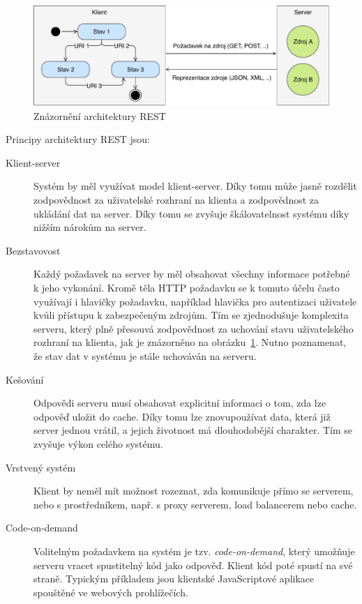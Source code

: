 \begin{figure}[t]
    \centering
    \includegraphics[keepaspectratio=true, width=0.9\linewidth]{figures/rest-statelessness.pdf}
    \caption{Znázornění architektury \gls{REST}}
    \label{fig:rest-statelessness}
\end{figure}

Principy architektury \gls{REST} jsou:

\begin{description}
    \item [Klient-server] Systém by měl využívat model klient-server. Díky tomu může jasně rozdělit
    zodpovědnost za uživatelské rozhraní na klienta a zodpovědnost za ukládání dat na server. Díky tomu se zvyšuje
    škálovatelnost systému díky nižším nárokům na server.
    \item [Bezstavovost] Každý požadavek na server by měl obsahovat všechny informace potřebné k jeho vykonání.
    Kromě těla \gls{HTTP} požadavku se k tomuto účelu často využívají i hlavičky požadavku,
    například hlavička  pro autentizaci uživatele kvůli přístupu k zabezpečeným zdrojům.
    Tím se zjednodušuje komplexita serveru, který plně přesouvá zodpovědnost za uchování stavu uživatelského rozhraní
    na klienta, jak je znázorněno na obrázku~\ref{fig:rest-statelessness}. Nutno poznamenat, že stav dat v systému
    je stále uchováván na serveru.
    \item [Kešování] Odpovědi serveru musí obsahovat explicitní informaci o tom, zda lze odpověď uložit do cache.
    Díky tomu lze znovupoužívat data, která již server jednou vrátil, a jejich životnost má dlouhodobější charakter.
    Tím se zvyšuje výkon celého systému.
    \item [Vrstvený systém] Klient by neměl mít možnost rozeznat, zda komunikuje přímo se serverem, nebo s prostředníkem,
    např. s proxy serverem, load balancerem nebo cache.
    \item [Code-on-demand] Volitelným požadavkem na systém je tzv. \textit{code-on-demand}, který umožňuje serveru vracet
    spustitelný kód jako odpověď. Klient kód poté spustí na své straně. Typickým příkladem jsou klientské JavaScriptové aplikace spouštěné ve webových prohlížečích.

\end{description}
